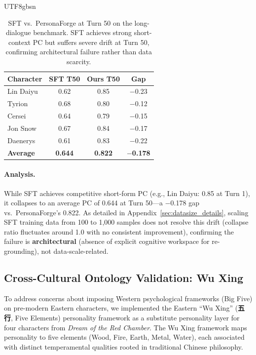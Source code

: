 \documentclass[11pt]{article}
\begin{document}
\begin{CJK*}{UTF8}{gbsn}
\begin{table}[h]
\centering
\small
\begin{tabular}{lccc}
\toprule
\textbf{Character} & \textbf{SFT T50} & \textbf{Ours T50} & \textbf{Gap} \\
\midrule
Lin Daiyu & 0.62 & 0.85 & $-$0.23 \\
Tyrion & 0.68 & 0.80 & $-$0.12 \\
Cersei & 0.64 & 0.79 & $-$0.15 \\
Jon Snow & 0.67 & 0.84 & $-$0.17 \\
Daenerys & 0.61 & 0.83 & $-$0.22 \\
\midrule
\textbf{Average} & \textbf{0.644} & \textbf{0.822} & \textbf{$-$0.178} \\
\bottomrule
\end{tabular}
\caption{SFT vs.\ PersonaForge at Turn 50 on the long-dialogue benchmark. SFT achieves strong short-context PC but suffers severe drift at Turn 50, confirming architectural failure rather than data scarcity.}
\label{tab:sft_longterm}
\end{table}

\paragraph{Analysis.} While SFT achieves competitive short-form PC (e.g., Lin Daiyu: 0.85 at Turn 1), it collapses to an average PC of 0.644 at Turn 50---a $-$0.178 gap vs.\ PersonaForge's 0.822. As detailed in Appendix~\ref{sec:datasize_details}, scaling SFT training data from 100 to 1,000 samples does not resolve this drift (collapse ratio fluctuates around 1.0 with no consistent improvement), confirming the failure is \textbf{architectural} (absence of explicit cognitive workspace for re-grounding), not data-scale-related.

\subsection{Cross-Cultural Ontology Validation: Wu Xing}
\label{sec:wuxing}

To address concerns about imposing Western psychological frameworks (Big Five) on pre-modern Eastern characters, we implemented the Eastern ``Wu Xing'' (\textbf{五行}, Five Elements) personality framework as a substitute personality layer for four characters from \textit{Dream of the Red Chamber}. The Wu Xing framework maps personality to five elements (Wood, Fire, Earth, Metal, Water), each associated with distinct temperamental qualities rooted in traditional Chinese philosophy.


\end{CJK*}
\end{document}
